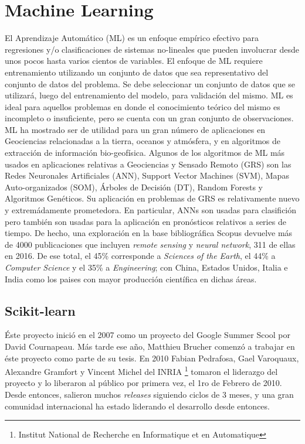



\section{Machine Learning}

El Aprendizaje Automático (ML) es un enfoque empírico efectivo para
regresiones y/o clasificaciones de sistemas no-lineales que pueden involucrar desde
unos pocos hasta varios cientos de variables. El enfoque de ML requiere
entrenamiento utilizando un conjunto de datos que sea representativo del conjunto
de datos del problema. Se debe seleccionar un conjunto de datos que se utilizará,
luego del entrenamiento del modelo, para validación del mismo.
ML es ideal para aquellos problemas en donde el conocimiento teórico del mismo
es incompleto o insuficiente, pero se cuenta con un gran conjunto de observaciones.
ML ha mostrado ser de utilidad para un gran número de aplicaciones en Geociencias
relacionadas a la tierra, oceanos y atmósfera, y en algoritmos de extracción
de información bio-geofísica.
Algunos de los algoritmos de ML más usados en aplicaciones relativas a
Geociencias y Sensado Remoto (GRS) son las Redes Neuronales Artificiales (ANN),
Support Vector Machines (SVM), Mapas Auto-organizados (SOM), Árboles de Decisión (DT),
Random Forests y Algoritmos Genéticos. Su aplicación en problemas de GRS es
relativamente nuevo y extremádamente prometedora. En particular, ANNs son
usadas para clasifición pero también son usadas para la aplicación en pronósticos
relativos a series de tiempo.
De hecho, una exploración en la base bibliográfica Scopus devuelve más de 4000
publicaciones que incluyen \textit{remote sensing} y \textit{neural network},
311 de ellas en 2016. De ese total, el 45\% corresponde a
\textit{Sciences of the Earth}, el 44\% a \textit{Computer Science} y el 35\% a
\textit{Engineering}; con China, Estados Unidos, Italia e India como los paises
con mayor producción científica en dichas áreas.


\subsection{Scikit-learn}
Éste proyecto inició en el 2007 como un proyecto del Google Summer Scool por David
Cournapeau. Más tarde ese año, Matthieu Brucher comenzó a trabajar en éste proyecto
como parte de su tesis. En 2010 Fabian Pedrafosa, Gael Varoquaux, Alexandre
Gramfort y Vincent Michel del INRIA \footnote{Institut National de Recherche
en Informatique et en Automatique} tomaron el liderazgo del proyecto y lo liberaron
al público por primera vez, el 1ro de Febrero de 2010. Desde entonces, salieron muchos
\textit{releases} siguiendo ciclos de 3 meses, y una gran comunidad internacional
ha estado liderando el desarrollo desde entonces.

